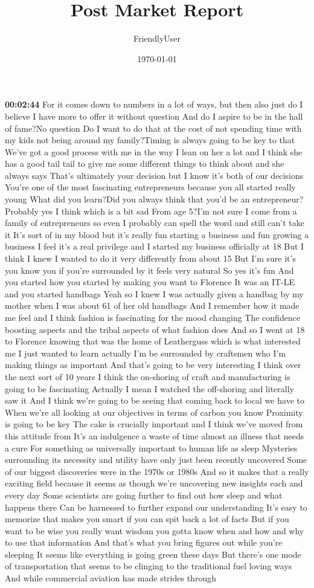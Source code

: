 \documentclass{article}%
\title{Post Market Report}%
\author{FriendlyUser}%
\date{\today}%
\begin{document}
%
\normalsize%
\textbf{00:02:44}%
\newline%
For it comes down to numbers in a lot of ways, but then also just do I believe I have more to offer it without question And do I aspire to be in the hall of fame?No question Do I want to do that at the cost of not spending time with my kids not being around my family?Timing is always going to be key to that We've got a good process with me in the way I lean on her a lot and I think she has a good tail tail to give me some different things to think about and she always says That's ultimately your decision but I know it's both of our decisions You're one of the most fascinating entrepreneurs because you all started really young What did you learn?Did you always think that you'd be an entrepreneur?Probably yes I think which is a bit sad From age 5?I'm not sure I come from a family of entrepreneurs so even I probably can spell the word and still can't take it It's sort of in my blood but it's really fun starting a business and fun growing a business I feel it's a real privilege and I started my business officially at 18 But I think I knew I wanted to do it very differently from about 15 But I'm sure it's you know you if you're surrounded by it feels very natural So yes it's fun And you started how you started by making you want to Florence It was an IT{-}LE and you started handbags Yeah so I knew I was actually given a handbag by my mother when I was about 61 of her old handbags And I remember how it made me feel and I think fashion is fascinating for the mood changing The confidence boosting aspects and the tribal aspects of what fashion does And so I went at 18 to Florence knowing that was the home of Leatherguss which is what interested me I just wanted to learn actually I'm be surrounded by craftsmen who I'm making things as important And that's going to be very interesting I think over the next sort of 10 years I think the on{-}shoring of craft and manufacturing is going to be fascinating Actually I mean I watched the off{-}shoring and literally saw it And I think we're going to be seeing that coming back to local we have to When we're all looking at our objectives in terms of carbon you know Proximity is going to be key The cake is crucially important and I think we've moved from this attitude from It's an indulgence a waste of time almost an illness that needs a cure For something as universally important to human life as sleep Mysteries surrounding its necessity and utility have only just been recently uncovered Some of our biggest discoveries were in the 1970s or 1980s And so it makes that a really exciting field because it seems as though we're uncovering new insights each and every day Some scientists are going further to find out how sleep and what happens there Can be harnessed to further expand our understanding It's easy to memorize that makes you smart if you can spit back a lot of facts But if you want to be wise you really want wisdom you gotta know when and how and why to use that information And that's what you bring figures out while you're sleeping It seems like everything is going green these days But there's one mode of transportation that seems to be clinging to the traditional fuel loving ways And while commercial aviation has made strides through 
\end{document}
